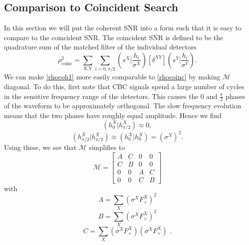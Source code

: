\documentclass[11pt]{cuthesis}
\newcommand{\fs}{\text{ .}}
\begin{document}
\subsection{Comparison to Coincident Search}
In this section we will put the coherent SNR into a form such that it is easy to compare to the coincident SNR. The coincident SNR is defined to be the quadrature sum of the matched filter of the individual detectors
\begin{equation} \label{rhocoinc}
\rho^2_\text{coinc} = \sum_\text{X,Y} \sum_{i=0,\pi/2} \left( s^X \bigg| \frac{h_i}{\sigma^X} \right)[\delta^{XY}]\left( s^Y \bigg| \frac{h_i}{\sigma^Y} \right) \textbf{.}
\end{equation}
We can make \ref{rhocoh1} more easily comparable to \ref{rhocoinc} by making $\mathcal{M}$ diagonal. To do this, first note that CBC signals spend a large number of cycles in the sensitive frequency range of the detectors. This causes the $0$ and $\frac{\pi}{2}$ phases of the waveform to be approximately orthogonal. The slow frequency evolution means that the two phases have roughly equal amplitude. Hence we find 
\begin{equation}
(h_0^X|h_{\pi/2}^X)\approx 0 ,
\end{equation}
\begin{equation}
(h_{\pi/2}^X|h_{\pi/2}^X)\approx (h_0^X|h_0^X) = (\sigma^X)^2 \textbf{.}
\end{equation}
Using these, we see that $\mathcal{M}$  simplifies to
\[
\mathcal{M}
=
\begin{bmatrix}
A & C & 0 & 0 \\
C & B & 0 & 0 \\
0 & 0 & A & C \\
0 & 0 & C & B 
\end{bmatrix}
\] 
with 
\begin{equation}
A = \sum_X (\sigma^X F_+^X)^2
\end{equation}
\begin{equation}
B = \sum_X (\sigma^X F_\times^X)^2
\end{equation}
\begin{equation} \label{C eqn}
C = \sum_X (\sigma^X F_+^X)(\sigma^X F_\times^X) \fs
\end{equation}
\end{document}
